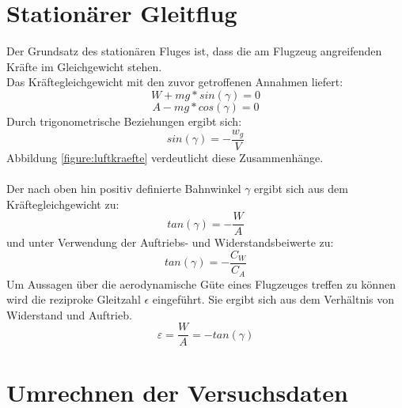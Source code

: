 \section{Stationärer Gleitflug}
Der Grundsatz des stationären Fluges ist, dass die am Flugzeug angreifenden Kräfte im Gleichgewicht stehen. \\
Das Kräftegleichgewicht mit den zuvor getroffenen Annahmen liefert:
\begin{equation}
\label{eq:kräftegleichgewichtWiderstand}
W + mg*sin(\gamma) = 0
\end{equation}
%
%
%
\begin{equation}
\label{eq:kräftegleichgewichtAuftrieb}
A - mg*cos(\gamma) = 0
\end{equation}
Durch trigonometrische Beziehungen ergibt sich:
\begin{equation}
\label{eq:bahnneigungswinkel}
sin(\gamma) = -\frac{w_g}{V}
\end{equation}
%
%
Abbildung \ref{figure:luftkraefte} verdeutlicht diese Zusammenhänge.\\ \\
Der nach oben hin positiv definierte Bahnwinkel $\gamma$ ergibt sich aus dem Kräftegleichgewicht zu:
\begin{equation}
tan(\gamma)=-\frac{W}{A}
\end{equation}
und unter Verwendung der Auftriebs- und Widerstandsbeiwerte zu:
\begin{equation}
tan(\gamma)=-\frac{C_W}{C_A}
\end{equation}
%
%
Um Aussagen über die aerodynamische Güte eines Flugzeuges treffen zu können wird die reziproke Gleitzahl $\epsilon$ eingeführt. Sie ergibt sich aus dem Verhältnis von Widerstand und Auftrieb.
\begin{equation}
\varepsilon=\frac{W}{A}=-tan(\gamma)
\end{equation}
%

\section{Umrechnen der Versuchsdaten}
